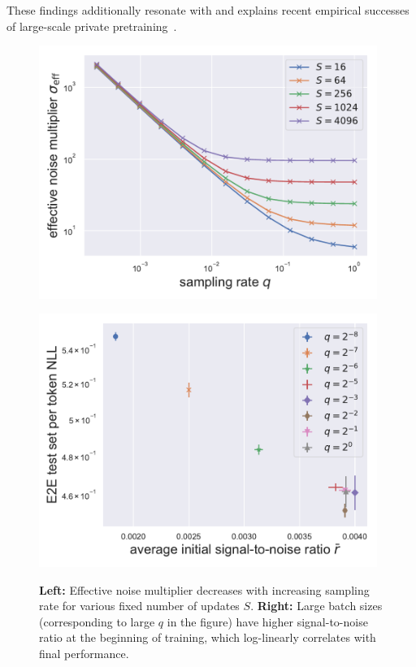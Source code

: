 These findings additionally resonate with and explains recent empirical successes of large-scale private pretraining~\citep{anil2021large}.
\begin{figure}[htb]
\begin{center}
\begin{minipage}[t]{0.48\linewidth}
\centering
{\includegraphics[width=0.98\textwidth]{figs/fixed_t_q_vs_sigma_eff_3.pdf}}
\end{minipage}
\begin{minipage}[t]{0.48\linewidth}
\centering
{\includegraphics[width=0.98\textwidth]{figs/snr_vs_test_xent.pdf}}
\end{minipage}
\end{center}
\caption{
\textbf{Left:} Effective noise multiplier decreases with increasing sampling rate for various fixed number of updates $S$.
\textbf{Right:} Large batch sizes (corresponding to large $q$ in the figure) have higher signal-to-noise ratio at the beginning of training, which log-linearly correlates with final performance.
}
\label{fig:batch_size_fixed_t}
\end{figure}

